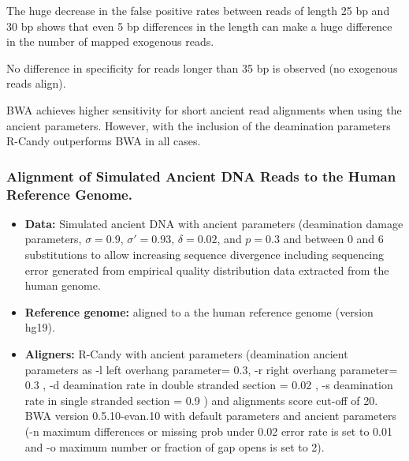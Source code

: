 \documentclass[11pt,a4paper]{report}
\begin{document}
The huge decrease in the false positive rates between reads of length 25 bp and
30 bp shows that even 5 bp differences in the length can make a huge difference in the 
number of mapped exogenous reads.


No difference in specificity for reads longer than 35 bp is observed (no exogenous 
reads align).

BWA achieves higher sensitivity for short ancient read alignments when using the 
ancient parameters. However, with the inclusion of the deamination parameters 
R-Candy outperforms BWA in all cases.





\subsubsection{Alignment of Simulated Ancient DNA Reads to the Human Reference Genome.}
\label{Alignment of Simulated Ancient DNA Reads to the Human Reference Genome.}
 
 \begin{itemize}
 
    \item \textbf{Data:} Simulated ancient DNA 
     with ancient parameters (deamination damage parameters, $ \sigma = 0.9$, 
    $ \sigma' = 0.93 $, $\delta = 0.02 $,  and $p = 0.3 $ and 
    between 0 and 6 substitutions to allow increasing sequence divergence
    including sequencing error generated from empirical quality distribution data
    extracted from the human genome.
  
   \item \textbf{Reference genome:} aligned to a the human reference genome (version hg19).

 
    \item \textbf{Aligners:} 
	R-Candy with ancient parameters 
	(deamination ancient parameters as -l left overhang parameter= 0.3, -r 
	right overhang parameter= 0.3 , 
	-d deamination rate in double stranded section = 0.02 , 
	-s deamination rate in single stranded section = 0.9 )
	and alignments score cut-off of 20. \\
	BWA version 0.5.10-evan.10 with default parameters and ancient parameters 
	(-n maximum differences or missing prob under 0.02 error rate is set to 0.01 
    and -o maximum number or fraction of gap opens is set to 2)\cite{green2010draft}.
 
  \end{itemize}
 
\end{document}

